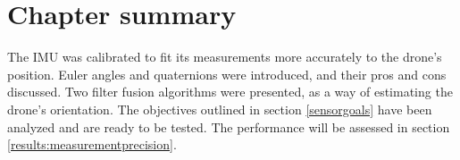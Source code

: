 \section{Chapter summary}
The IMU was calibrated to fit its measurements more accurately to the drone's position. Euler angles and quaternions were introduced, and their pros and cons discussed. Two filter fusion algorithms were presented, as a way of estimating the drone's orientation. The objectives outlined in section \ref{sensorgoals} have been analyzed and are ready to be tested. The performance will be assessed in section \ref{results:measurementprecision}. 